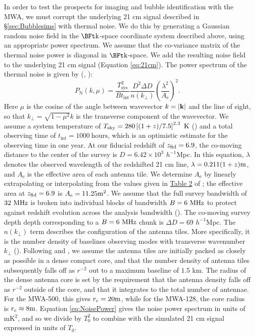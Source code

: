 In order to test the prospects for imaging and bubble identification with
the MWA, we must corrupt the underlying 21 cm signal described in \S \ref{sec:Bubblesims}
with thermal noise. We do this by generating a Gaussian random noise field in
the $\k$-space coordinate system described above, using an appropriate power spectrum. We assume that
the co-variance matrix of the thermal noise power is diagonal in $\k$-space. We add
the resulting noise field to the underlying 21 cm signal (Equation \ref{eq:21cm}).
The power spectrum of the thermal noise is given by (\citealt{McQuinn2006}, \citealt{Furlanetto2006}):
\begin{equation}
P_{\text{N}}(k,\mu) =
\frac{T_{\text{sys}}^2}{Bt_{\text{int}}}\frac{D^2\Delta
  D}{n(k_\perp)}\left( \frac{\lambda^2}{A_{\text{e}}}
\right)^{2}. \label{eq:NoisePower}
\end{equation}
Here $\mu$ is the cosine of the angle between wavevector $k = |{\bf
  k}|$ and the line of sight, so that $k_{\perp} = \sqrt{1-\mu^2} k$ is the transverse component of the wavevector. We 
assume a system temperature of $T_{\text{sky}} = 280
\left[(1+z)/7.5\right]^{2.3}\kelvin$ (\citealt{Wyithe:2007if}) and a total
observing time of $t_{\text{int}} = 1000\ \text{hours}$, which is an optimistic
estimate for the observing time in one year. At our fiducial redshift of $z_{\rm fid} = 6.9$, the co-moving
distance to the
center of the survey is $D = 6.42 \times 10^3$ $h^{-1}$Mpc. In this equation, $\lambda$ denotes
the observed wavelength of the redshifted 21 cm line,
$\lambda = 0.211(1+z) \meter$, and $A_{\text{e}}$ is the effective area of
each antenna tile. We determine $A_{\text{e}}$ by linearly extrapolating
or interpolating from the values given in
\href{http://iopscience.iop.org/0004-637X/661/1/1/fulltext/64283.tb2.html}{Table
  2} of \cite{Bowman:2005hj}; the effective area at $z_{\rm fid} = 6.9$ is
$A_{\text{e}}=11.25 \meter^2$. We assume that the full survey bandwidth of
$32 \MHz$ is broken into individual blocks of bandwidth $B = 6 \MHz$ to protect
against redshift evolution across the analysis bandwidth (\citealt{McQuinn:2005hk}). The co-moving survey depth depth corresponding to a $B= 6 \MHz$ chunk is $\Delta D = 69$ $h^{-1}$Mpc.
The $n(k_\perp)$ term describes the configuration of the antenna tiles. More specifically,
it is the number density of baselines observing modes with transverse wavenumber
$k_{\perp}$ (\citealt{McQuinn:2005hk}). Following \cite{Bowman:2005cr} and \cite{McQuinn:2005hk},
we assume the antenna tiles are initially packed as closely as possible in a
dense compact core, and that the number density of antenna tiles subsequently falls off
as $r^{-2}$ out to a
maximum baseline of $1.5$ km. The radius of the dense antenna core
is set  by the requirement that the antenna density falls off as
$r^{-2}$ outside of the core, and that it integrates to the total
number of antennae. For the MWA-500, this gives $r_{\text{c}}
= 20 \meter$, while for the MWA-128, the core radius is $r_{\text{c}}
\approx 8 \meter$. Equation \ref{eq:NoisePower} gives the noise power spectrum in
units of mK$^2$, and so we divide by $T_0^2$ to combine with the simulated 21 cm signal expressed
in units of $T_0$.

